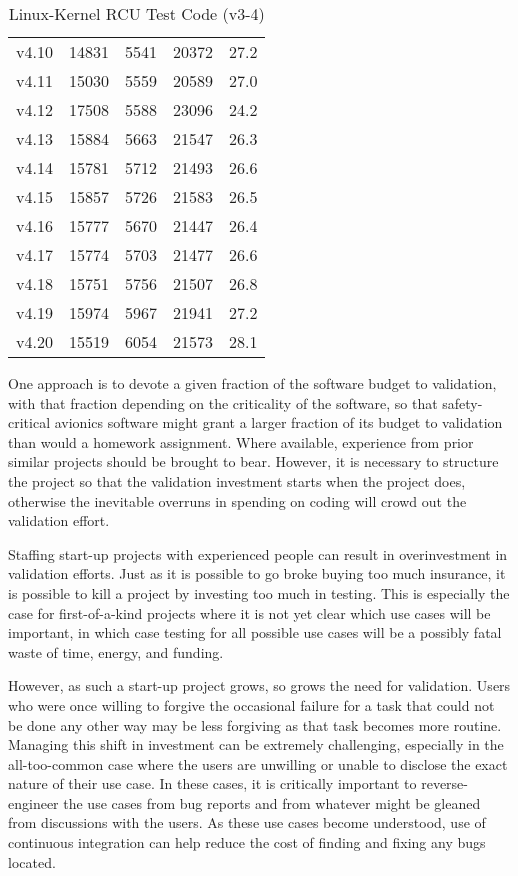 \begin{table}[tbhp]
\begin{tabular}{lrrrr}
v4.10 & 14831 & 5541 & 20372 & 27.2 \\
v4.11 & 15030 & 5559 & 20589 & 27.0 \\
v4.12 & 17508 & 5588 & 23096 & 24.2 \\
v4.13 & 15884 & 5663 & 21547 & 26.3 \\
v4.14 & 15781 & 5712 & 21493 & 26.6 \\
v4.15 & 15857 & 5726 & 21583 & 26.5 \\
v4.16 & 15777 & 5670 & 21447 & 26.4 \\
v4.17 & 15774 & 5703 & 21477 & 26.6 \\
v4.18 & 15751 & 5756 & 21507 & 26.8 \\
v4.19 & 15974 & 5967 & 21941 & 27.2 \\
v4.20 & 15519 & 6054 & 21573 & 28.1 \\
\bottomrule
\end{tabular}
\caption{Linux-Kernel RCU Test Code (v3-4)}
\label{tab:formal:Linux-Kernel RCU Test Code (v3-4)}
\end{table}

One approach is to devote a given fraction of the software budget to
validation, with that fraction depending on the criticality of the
software, so that safety-critical avionics software might grant a
larger fraction of its budget to validation than would a homework
assignment.
Where available, experience from prior similar projects should be
brought to bear.
However, it is necessary to structure the project so that the validation
investment starts when the project does, otherwise the inevitable overruns
in spending on coding will crowd out the validation effort.

Staffing start-up projects with experienced people can result in
overinvestment in validation efforts.
Just as it is possible to go broke buying too much insurance, it is
possible to kill a project by investing too much in testing.
This is especially the case for first-of-a-kind projects where it is
not yet clear which use cases will be important, in which case testing
for all possible use cases will be a possibly fatal waste of time,
energy, and funding.

However, as such a start-up project grows, so grows the need for
validation.
Users who were once willing to forgive the occasional failure for a
task that could not be done any other way may be less forgiving
as that task becomes more routine.
Managing this shift in investment can be extremely challenging,
especially in the all-too-common case where the users are unwilling
or unable to disclose the exact nature of their use case.
In these cases, it is critically important to reverse-engineer the
use cases from bug reports and from whatever might be gleaned from
discussions with the users.
As these use cases become understood, use of continuous integration
can help reduce the cost of finding and fixing any bugs located.

